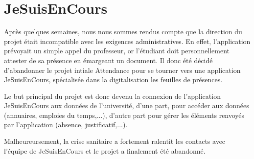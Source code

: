 \section{JeSuisEnCours}

Après quelques semaines, nous nous sommes rendus compte que la direction du projet était incompatible avec les exigences administratives. En effet, l'application prévoyait un simple appel du professeur, or l'étudiant doit personnellement attester de sa présence en émargeant un document. Il donc été décidé d'abandonner le projet intiale Attendance pour se tourner vers une application JeSuisEnCours, spécialisée dans la digitalisation les feuilles de présences. 

Le but principal du projet est donc devenu la connexion de l'application JeSuisEnCours aux données de l'université, d'une part, pour accéder aux données (annuaires, emploies du temps,...), d'autre part pour gérer les éléments renvoyés par l'application (absence, justificatif,...).

Malheureursement, la crise sanitaire a fortement ralentit les contacts avec l'équipe de JeSuisEnCours et le projet a finalement été abandonné.